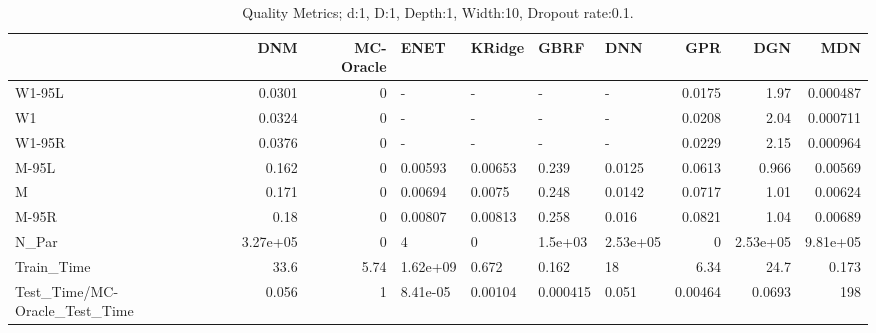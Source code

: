 \begin{table}
\centering
\caption{Quality Metrics; d:1, D:1, Depth:1, Width:10, Dropout rate:0.1.}
\begin{tabular}{lrrllllrrr}
\toprule
{} &      DNM &  MC-Oracle &     ENET &  KRidge &     GBRF &      DNN &     GPR &      DGN &      MDN \\
\midrule
W1-95L                        &   0.0301 &          0 &        - &       - &        - &        - &  0.0175 &     1.97 & 0.000487 \\
W1                            &   0.0324 &          0 &        - &       - &        - &        - &  0.0208 &     2.04 & 0.000711 \\
W1-95R                        &   0.0376 &          0 &        - &       - &        - &        - &  0.0229 &     2.15 & 0.000964 \\
M-95L                         &    0.162 &          0 &  0.00593 & 0.00653 &    0.239 &   0.0125 &  0.0613 &    0.966 &  0.00569 \\
M                             &    0.171 &          0 &  0.00694 &  0.0075 &    0.248 &   0.0142 &  0.0717 &     1.01 &  0.00624 \\
M-95R                         &     0.18 &          0 &  0.00807 & 0.00813 &    0.258 &    0.016 &  0.0821 &     1.04 &  0.00689 \\
N\_Par                         & 3.27e+05 &          0 &        4 &       0 &  1.5e+03 & 2.53e+05 &       0 & 2.53e+05 & 9.81e+05 \\
Train\_Time                    &     33.6 &       5.74 & 1.62e+09 &   0.672 &    0.162 &       18 &    6.34 &     24.7 &    0.173 \\
Test\_Time/MC-Oracle\_Test\_Time &    0.056 &          1 & 8.41e-05 & 0.00104 & 0.000415 &    0.051 & 0.00464 &   0.0693 &      198 \\
\bottomrule
\end{tabular}
\end{table}
